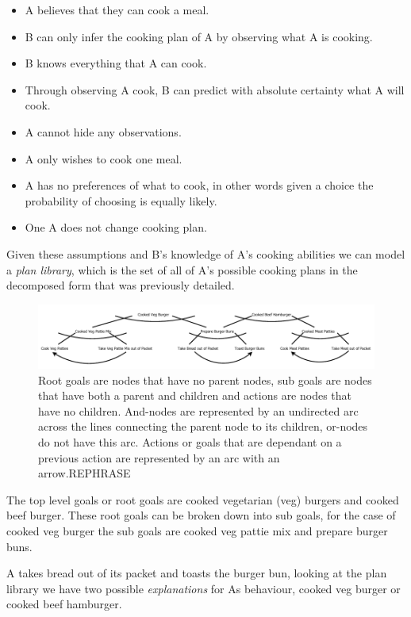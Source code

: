 \documentclass[parskip]{cs4rep}
\begin{document}
\begin{itemize}
\item
A believes that they can cook a meal.
\item
B can only infer the cooking plan of A by observing what A is cooking.
\item
B knows everything that A can cook.
\item
Through observing A cook, B can predict with absolute certainty what A will cook.
\item
A cannot hide any observations.
\item
A only wishes to cook one meal.
\item
A has no preferences of what to cook, in other words given a choice the probability of choosing is equally likely.
\item
One A does not change cooking plan.
\end{itemize}

Given these assumptions and B's knowledge of A's cooking abilities we can model a \textit{plan library}, which is the set of all of A's possible cooking plans in the decomposed form that was previously detailed.

\begin{figure}[h]
\centering
\includegraphics{images/example-plan-recognition}
\caption{Root goals are nodes that have no parent nodes, sub goals are nodes that have both a parent and children and actions are nodes that have no children. And-nodes are represented by an undirected arc across the lines connecting the parent node to its children, or-nodes do not have this arc. Actions or goals that are dependant on a previous action are represented by an arc with an arrow.REPHRASE}
\label{fig:example-plan-library}
\end{figure} 

The top level goals or root goals are cooked vegetarian (veg) burgers and cooked beef burger. These root goals can be broken down into sub goals, for the case of cooked veg burger the sub goals are cooked veg pattie mix and prepare burger buns.

A takes bread out of its packet and toasts the burger bun, looking at the plan library we have two possible \textit{explanations} for As behaviour, cooked veg burger or cooked beef hamburger.
\end{document}
